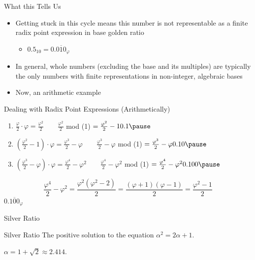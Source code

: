 \documentclass{beamer}
\begin{document}
\begin{frame}{What this Tells Us}
  \begin{itemize}
    \item Getting stuck in this cycle means this number is not representable as a finite radix point expression in base golden ratio \pause
    \begin{itemize}
      \item $0.5_{10}=0.\overline{010}_\varphi$
    \end{itemize}\pause
    \item In general, whole numbers (excluding the base and its multiples) are typically the only numbers with finite representations in non-integer, algebraic bases \pause
    \item Now, an arithmetic example
  \end{itemize}
\end{frame}

\begin{frame}{Dealing with Radix Point Expressions (Arithmetically)}
  \begin{example}\pause
    \begin{enumerate}
      \item[] $\frac{\varphi}{2}\cdot\varphi = \frac{\varphi^2}{2} \qquad \frac{\varphi^2}{2}$ mod (1) $ = \frac{\varphi^2}{2}-1 \hfill 0.1\pause$
      \item[] $(\frac{\varphi^2}{2} -1)\cdot\varphi = \frac{\varphi^3}{2} -\varphi \qquad \frac{\varphi^3}{2} -\varphi$ mod (1) $= \frac{\varphi^3}{2} -\varphi \hfill 0.10\pause$
      \item[] $(\frac{\varphi^3}{2} -\varphi)\cdot\varphi = \frac{\varphi^4}{2} -\varphi^2 \qquad \frac{\varphi^4}{2} -\varphi^2$ mod (1) $= \frac{\varphi^4}{2} -\varphi^2 \hfill 0.100\pause$
    \end{enumerate}
    $$\frac{\varphi^4}{2} -\varphi^2 = \frac{\varphi^2(\varphi^2 - 2)}{2} = \frac{(\varphi +1)(\varphi - 1)}{2} =\frac{\varphi^2 - 1}{2}$$
    \hfill $0.\overline{100}_\varphi$
  \end{example}
\end{frame}

\begin{frame}{Silver Ratio}
  \begin{block}{Silver Ratio}
    The positive solution to the equation $\alpha^2 = 2\alpha + 1$.

    $\alpha = 1+\sqrt{2} \approx 2.414$.
  \end{block}
\end{frame}
\end{document}
